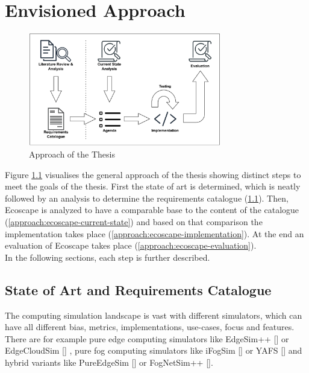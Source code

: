 \chapter{Envisioned Approach}
\begin{figure}[H]
  \centering
  \includegraphics[width=0.75\textwidth]{img/approach_figure.pdf}
  \caption{Approach of the Thesis}
  \label{fig:approach_figure}
\end{figure}

Figure \ref{fig:approach_figure} visualises the general approach of the thesis showing distinct steps to meet the goals of the thesis.
First the state of art is determined, which is neatly followed by an analysis to determine the requirements catalogue (\ref{approach:state-of-art}).
Then, Ecoscape is analyzed to have a comparable base to the content of the catalogue (\ref{approach:ecoscape-current-state}) and based on that comparison the implementation takes place (\ref{approach:ecoscape-implementation}).
At the end an evaluation of Ecoscape takes place (\ref{approach:ecoscape-evaluation}).
\\
In the following sections, each step is further described.
\section{State of Art and Requirements Catalogue}\label{approach:state-of-art}
The computing simulation landscape is vast with different simulators, which can have all different bias, metrics, implementations, use-cases, focus and features.
There are for example pure edge computing simulators like EdgeSim++ [\cite{10612841}] or EdgeCloudSim [\cite{10.1002/ett.3493}] , pure fog computing simulators like iFogSim [\cite{gupta2016ifogsimtoolkitmodelingsimulation}] or YAFS [\cite{8758823}] and hybrid variants like PureEdgeSim [\cite{9188059}] or FogNetSim++ [\cite{8502760}].

